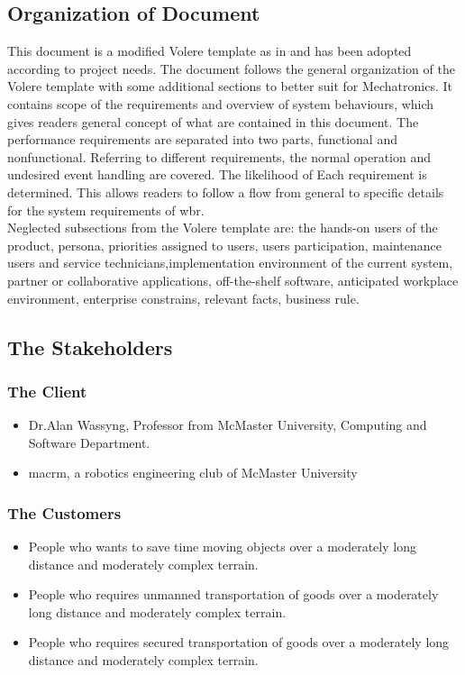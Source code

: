 \documentclass[12pt]{article}
\begin{document}
\subsection{Organization of Document}
This document is a modified Volere template as in \cite{RobertsonAndRobertson2012} and has been adopted according to project needs. The document follows the general organization of the Volere template with some additional sections to better suit for Mechatronics. It contains scope of the requirements and overview of system behaviours, which gives readers general concept of what are contained in this document. The performance requirements are separated into two parts, functional and nonfunctional. Referring to different requirements, the normal operation and undesired event handling are covered. The likelihood of Each requirement is determined. This allows readers to follow a flow from general to specific details for the system requirements of \acrshort{wbr}.\\
Neglected subsections from the Volere template are: the hands-on users of the product, persona, priorities assigned to users, users participation, maintenance users and service technicians,implementation environment of the current system, partner or collaborative applications, off-the-shelf software, anticipated workplace environment, enterprise constrains, relevant facts, business rule.
\subsection{The Stakeholders}
\subsubsection{The Client}
\begin{itemize}
    \item Dr.Alan Wassyng, Professor from McMaster University, Computing and Software Department.
    \item \acrfull{macrm}, a robotics engineering club of McMaster University
\end{itemize}

\subsubsection{The Customers}
\begin{itemize}
    \item People who wants to save time moving objects over a moderately long distance and moderately complex terrain.
    \item People who requires unmanned transportation of goods over a moderately long distance and moderately complex terrain.
    \item People who requires secured transportation of goods over a moderately long distance and moderately complex terrain.
\end{itemize}
\end{document}
